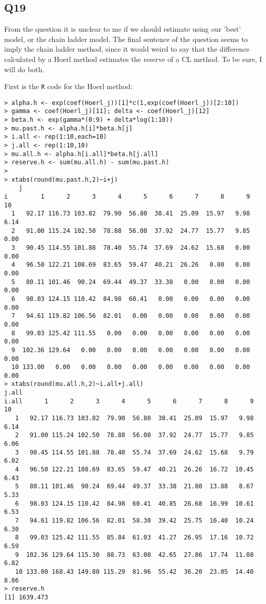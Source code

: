 \documentclass[11pt]{article}
\begin{document}
\subsection*{Q19}

From the question it is unclear to me if we should estimate using our 'best' model, or the chain ladder model. The final sentence of the question seems to imply the chain ladder method, since it would weird to say that the difference calculated by a Hoerl method estimates the reserve of a CL method. To be sure, I will do both.

First is the \verb|R| code for the Hoerl method:

\begin{verbatim}
> alpha.h <- exp(coef(Hoerl_j))[1]*c(1,exp(coef(Hoerl_j))[2:10])
> gamma <- coef(Hoerl_j)[11]; delta <- coef(Hoerl_j)[12]
> beta.h <- exp(gamma*(0:9) + delta*log(1:10))
> mu.past.h <- alpha.h[i]*beta.h[j]
> i.all <- rep(1:10,each=10)
> j.all <- rep(1:10,10)
> mu.all.h <- alpha.h[i.all]*beta.h[j.all]
> reserve.h <- sum(mu.all.h) - sum(mu.past.h)
> 
> xtabs(round(mu.past.h,2)~i+j)
    j
i         1      2      3      4      5      6      7      8      9     10
  1   92.17 116.73 103.82  79.90  56.80  38.41  25.09  15.97   9.98   6.14
  2   91.00 115.24 102.50  78.88  56.08  37.92  24.77  15.77   9.85   0.00
  3   90.45 114.55 101.88  78.40  55.74  37.69  24.62  15.68   0.00   0.00
  4   96.50 122.21 108.69  83.65  59.47  40.21  26.26   0.00   0.00   0.00
  5   80.11 101.46  90.24  69.44  49.37  33.38   0.00   0.00   0.00   0.00
  6   98.03 124.15 110.42  84.98  60.41   0.00   0.00   0.00   0.00   0.00
  7   94.61 119.82 106.56  82.01   0.00   0.00   0.00   0.00   0.00   0.00
  8   99.03 125.42 111.55   0.00   0.00   0.00   0.00   0.00   0.00   0.00
  9  102.36 129.64   0.00   0.00   0.00   0.00   0.00   0.00   0.00   0.00
  10 133.00   0.00   0.00   0.00   0.00   0.00   0.00   0.00   0.00   0.00
> xtabs(round(mu.all.h,2)~i.all+j.all)
j.all
i.all      1      2      3      4      5      6      7      8      9     10
   1   92.17 116.73 103.82  79.90  56.80  38.41  25.09  15.97   9.98   6.14
   2   91.00 115.24 102.50  78.88  56.08  37.92  24.77  15.77   9.85   6.06
   3   90.45 114.55 101.88  78.40  55.74  37.69  24.62  15.68   9.79   6.02
   4   96.50 122.21 108.69  83.65  59.47  40.21  26.26  16.72  10.45   6.43
   5   80.11 101.46  90.24  69.44  49.37  33.38  21.80  13.88   8.67   5.33
   6   98.03 124.15 110.42  84.98  60.41  40.85  26.68  16.99  10.61   6.53
   7   94.61 119.82 106.56  82.01  58.30  39.42  25.75  16.40  10.24   6.30
   8   99.03 125.42 111.55  85.84  61.03  41.27  26.95  17.16  10.72   6.59
   9  102.36 129.64 115.30  88.73  63.08  42.65  27.86  17.74  11.08   6.82
   10 133.00 168.43 149.80 115.29  81.96  55.42  36.20  23.05  14.40   8.86
> reserve.h
[1] 1639.473
\end{verbatim} 
\end{document}

